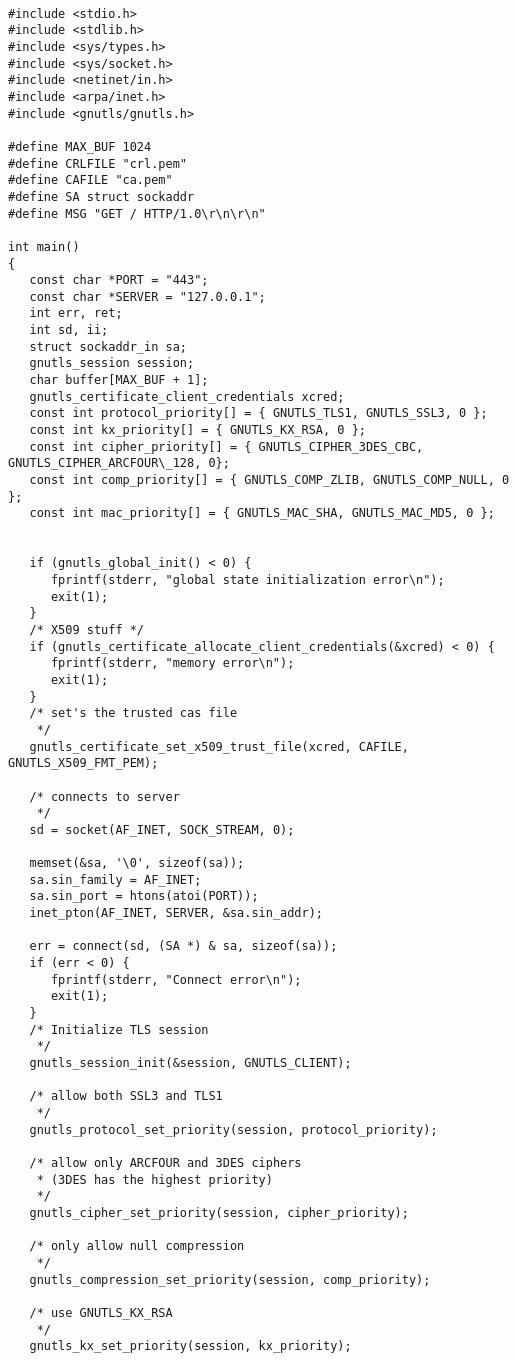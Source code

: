 \begin{verbatim}

#include <stdio.h>
#include <stdlib.h>
#include <sys/types.h>
#include <sys/socket.h>
#include <netinet/in.h>
#include <arpa/inet.h>
#include <gnutls/gnutls.h>

#define MAX_BUF 1024
#define CRLFILE "crl.pem"
#define CAFILE "ca.pem"
#define SA struct sockaddr
#define MSG "GET / HTTP/1.0\r\n\r\n"

int main()
{
   const char *PORT = "443";
   const char *SERVER = "127.0.0.1";
   int err, ret;
   int sd, ii;
   struct sockaddr_in sa;
   gnutls_session session;
   char buffer[MAX_BUF + 1];
   gnutls_certificate_client_credentials xcred;
   const int protocol_priority[] = { GNUTLS_TLS1, GNUTLS_SSL3, 0 };
   const int kx_priority[] = { GNUTLS_KX_RSA, 0 };
   const int cipher_priority[] = { GNUTLS_CIPHER_3DES_CBC, GNUTLS_CIPHER_ARCFOUR\_128, 0};
   const int comp_priority[] = { GNUTLS_COMP_ZLIB, GNUTLS_COMP_NULL, 0 };
   const int mac_priority[] = { GNUTLS_MAC_SHA, GNUTLS_MAC_MD5, 0 };


   if (gnutls_global_init() < 0) {
      fprintf(stderr, "global state initialization error\n");
      exit(1);
   }
   /* X509 stuff */
   if (gnutls_certificate_allocate_client_credentials(&xcred) < 0) {  
      fprintf(stderr, "memory error\n");
      exit(1);
   }
   /* set's the trusted cas file
    */
   gnutls_certificate_set_x509_trust_file(xcred, CAFILE, GNUTLS_X509_FMT_PEM);

   /* connects to server 
    */
   sd = socket(AF_INET, SOCK_STREAM, 0);

   memset(&sa, '\0', sizeof(sa));
   sa.sin_family = AF_INET;
   sa.sin_port = htons(atoi(PORT));
   inet_pton(AF_INET, SERVER, &sa.sin_addr);

   err = connect(sd, (SA *) & sa, sizeof(sa));
   if (err < 0) {
      fprintf(stderr, "Connect error\n");
      exit(1);
   }
   /* Initialize TLS session 
    */
   gnutls_session_init(&session, GNUTLS_CLIENT);

   /* allow both SSL3 and TLS1
    */
   gnutls_protocol_set_priority(session, protocol_priority);

   /* allow only ARCFOUR and 3DES ciphers
    * (3DES has the highest priority)
    */
   gnutls_cipher_set_priority(session, cipher_priority);

   /* only allow null compression
    */
   gnutls_compression_set_priority(session, comp_priority);

   /* use GNUTLS_KX_RSA
    */
   gnutls_kx_set_priority(session, kx_priority);


\end{verbatim}
